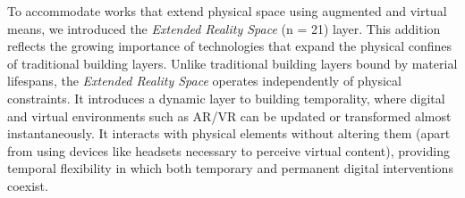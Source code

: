 To accommodate works that extend physical space using augmented and virtual means, we introduced the \textit{Extended Reality Space} (n = 21) layer. This addition reflects the growing importance of technologies that expand the physical confines of traditional building layers. Unlike traditional building layers bound by material lifespans, the \textit{Extended Reality Space} operates independently of physical constraints. It introduces a dynamic layer to building temporality, where digital and virtual environments such as AR/VR can be updated or transformed almost instantaneously. It interacts with physical elements without altering them (apart from using devices like headsets necessary to perceive virtual content), providing temporal flexibility in which both temporary and permanent digital interventions coexist. 
